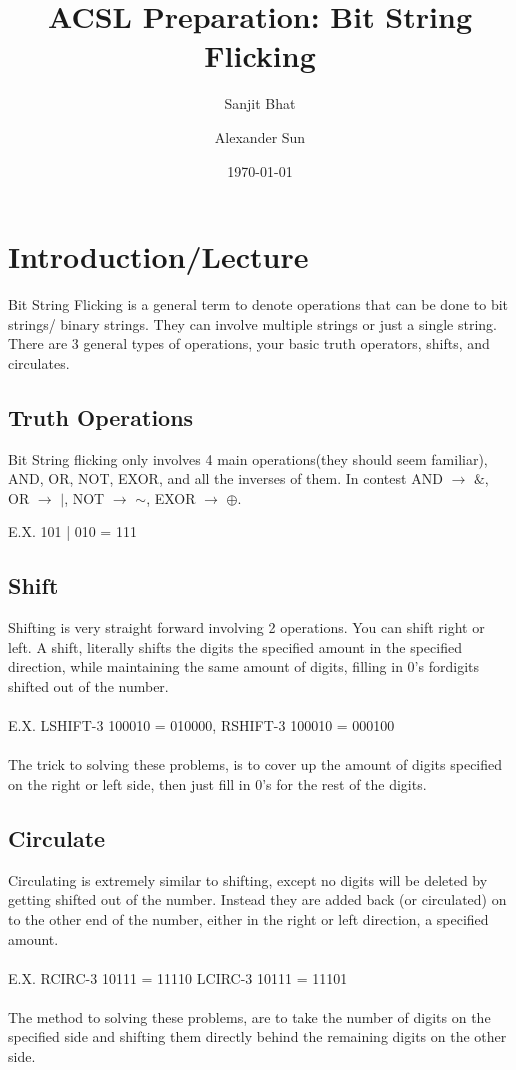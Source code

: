 \documentclass[11pt,letterpaper]{article}
\title{ACSL Preparation: Bit String Flicking}
\author{Sanjit Bhat \and Alexander Sun}
\date{\today}
\begin{document}
\maketitle

\section{Introduction/Lecture}
Bit String Flicking is a general term to denote operations that can be done to bit strings/ binary strings. They can involve multiple strings or just a single string. There are 3 general types of operations, your basic truth operators, shifts, and circulates.
\subsection{Truth Operations}
Bit String flicking only involves 4 main operations(they should seem familiar), AND, OR, NOT, EXOR, and all the inverses of them. In contest AND $\rightarrow$ $\&$, OR $\rightarrow$ $\mid$, NOT $\rightarrow$ $\sim$,  EXOR $\rightarrow$ $\oplus$.

E.X. 101 | 010 = 111
\subsection{Shift}
Shifting is very straight forward involving 2 operations. You can shift right or left. A shift, literally shifts the digits the specified amount in the specified direction, while maintaining the same amount of digits, filling in 0's fordigits shifted out of the number.
\\
\\
E.X. LSHIFT-3 100010 =  010000, RSHIFT-3 100010 = 000100
\\
\\
The trick to solving these problems, is to cover up the amount of digits specified on the right or left side, then just fill in 0's for the rest of the digits.
\subsection{Circulate}
Circulating is extremely similar to shifting, except no digits will be deleted by getting shifted out of the number. Instead they are added back (or circulated) on to the other end of the number, either in the right or left direction, a specified amount.
\\
\\
E.X. RCIRC-3    10111 = 11110         LCIRC-3   10111 = 11101
\\
\\
The method to solving these problems, are to take the number of digits on the specified side and shifting them directly behind the remaining digits on the other side.
\end{document}
